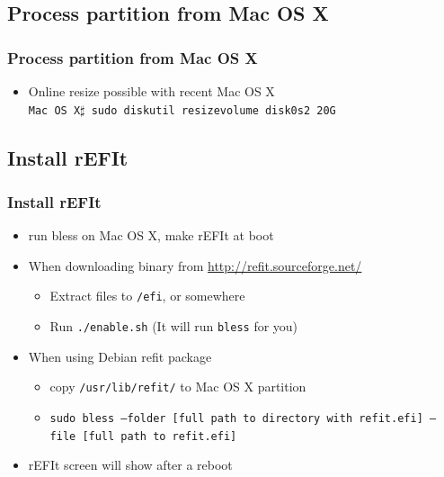 \documentclass[cjk,dvipdfmx]{beamer}
\begin{document}
\subsection{Process partition from Mac OS X}

\begin{frame}
 \frametitle{Process partition from Mac OS X}
\begin{itemize}
 \item Online resize possible with recent Mac OS X\\
       \texttt{Mac OS X$\sharp$  sudo diskutil resizevolume disk0s2 20G}
\end{itemize}
\end{frame}

\subsection{Install rEFIt}

\begin{frame}
 \frametitle{Install rEFIt}
 \begin{itemize}
  \item run bless on Mac OS X, make rEFIt at boot
  \item When downloading binary from \url{http://refit.sourceforge.net/}
  \begin{itemize}
   \item Extract files to \texttt{/efi}, or somewhere
   \item Run \texttt{./enable.sh} (It will run \texttt{bless} for you)
  \end{itemize} 
  \item When using Debian refit package
  \begin{itemize}
   \item copy \texttt{/usr/lib/refit/} to Mac OS X partition
   \item \texttt{sudo bless --folder [full path to directory with
	 refit.efi] --file [full path to refit.efi]}
  \end{itemize}
 \item rEFIt screen will show after a reboot
 \end{itemize}
\end{frame}
\end{document}
